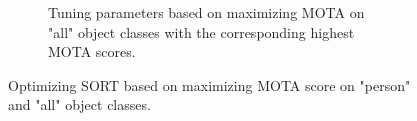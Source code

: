 \begin{figure}[!htbp]
\begin{subfigure}{1.0\linewidth}
    \caption{Tuning parameters based on maximizing MOTA on "all" object classes with the corresponding highest MOTA scores.}
    \label{fig:optimizing_tracker_all}
  \end{subfigure}
  

  \caption[Optimizing SORT based on maximizing MOTA score on "person" and "all" object classes]
  {Optimizing SORT based on maximizing MOTA score on "person" and "all" object classes.}
  \label{fig:optimizing_tracker} %
\end{figure}